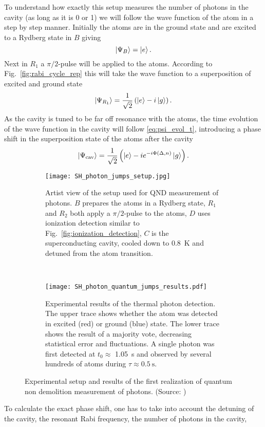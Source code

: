 To understand how exactly this setup measures the number of photons in the
cavity (as long as it is 0 or 1) we will follow the wave function of the atom in
a step by step manner. Initially the atoms are in the ground state and are
excited to a Rydberg state in $B$ giving
$$ \ket{\Psi_B} = \ket{e}.  $$
Next in $R_1$ a $\pi/2$-pulse will be applied to the atoms. According to
Fig.~\ref{fig:rabi_cycle_rep} this will take the wave function to a
superposition of excited and ground state
$$ \ket{\Psi_{R_1}} = \frac{1}{\sqrt{2}} \left( \ket{e} - i\ket{g}\right).  $$
As the cavity is tuned to be far off resonance with the atoms, the time
evolution of the wave function in the cavity will follow \eqref{eq:psi_evol_t},
introducing a phase shift in the superposition state of the atoms after the
cavity
$$ \ket{\Psi_{\text{cav}}} = \frac{1}{\sqrt{2}} \left(\ket{e} -i
e^{-i\Phi(\Delta,n)} \ket{g} \right).$$
\begin{figure}[t]
  \centering
  \begin{subfigure}[t]{.48\linewidth}
    \centering
    \texttt{[image: SH\_photon\_jumps\_setup.jpg]}
    \caption{Artist view of the setup used for QND measurement of photons. $B$
    prepares the atoms in a Rydberg state, $R_1$ and $R_2$ both apply a
    $\pi/2$-pulse to the atoms, $D$ uses ionization detection similar to
    Fig.~\ref{fig:ionization_detection}, $C$ is the superconducting cavity,
    cooled down to \SI{0.8}{\kelvin} and detuned
    from the atom transition.}
    \label{fig:QND_setup}
  \end{subfigure}
  ~
  \begin{subfigure}[t]{.48\linewidth}
    \centering
    \texttt{[image: SH\_photon\_quantum\_jumps\_results.pdf]}
    \caption{Experimental results of the thermal photon detection. The upper
    trace shows whether the atom was detected in excited (red) or ground (blue)
  state. The lower trace shows the result of a majority vote, decreasing
statistical error and fluctuations. A single photon was first detected at $t_0
\approx$ \SI{1.05}{\second} and observed by several hundreds of atoms during
$\tau \approx \SI{0.5}{\second}$.}
  \label{fig:quantum_jumps_results}
  \end{subfigure}
  \caption{Experimental setup and results of the first realization of quantum
  non demolition measurement of photons. (Source: \cite{gleyzes2007quantum})}
\end{figure}
To calculate the exact phase shift, one has to take into account the detuning of
the cavity, the resonant Rabi frequency, the number of photons in the cavity,
